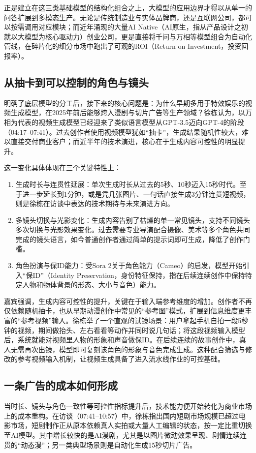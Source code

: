 \documentclass[UTF8,a4paper,11pt,fontset=fandol]{ctexart}
\begin{document}
正是建立在这三类基础模型的结构化组合之上，大模型的应用边界才得以从单一的问答扩展到多模态生产。无论是传统制造业与实体品牌商，还是互联网公司，都可以按需调用对应模块；而近年涌现的大量AI Native（AI原生，指从产品设计之初就以大模型为核心驱动力）创业公司，更是直接将千问与万相等模型组合为自动化管线，在碎片化的细分市场中跑出了可观的ROI（Return on Investment，投资回报率）。

\subsection{从抽卡到可以控制的角色与镜头}
明确了底层模型的分工后，接下来的核心问题是：为什么早期多用于特效娱乐的视频生成模型，在2025年前后能够跨入漫剧与切片广告等生产领域？徐栋认为，以万相为代表的视频生成模型已经迎来了类似语言模型从GPT-3.5迈向GPT-4的阶段（04:17–07:41）。过去创作者使用视频模型犹如“抽卡”，生成结果随机性较大，难以直接交付商业客户；而近半年的技术演进，核心在于生成内容可控性的明显提升。

这一变化具体体现在三个关键特性上：
\begin{enumerate}
\item 生成时长与连贯性延展：单次生成时长从过去的5秒、10秒迈入15秒时代。至于进一步延长到1分钟，或是凭几张图片、一句话直接生成3分钟连贯短视频，则是徐栋在访谈中表达的技术期待与未来演进方向。
\item 多镜头切换与光影变化：生成内容告别了枯燥的单一常见镜头，支持不同镜头多次切换与光影效果变化。过去需要专业导演配合摄像、美术等多个角色共同完成的镜头语言，如今普通创作者通过简单的提示词即可生成，降低了创作门槛。
\item 角色扮演与保ID能力：受Sora 2关于角色能力（Cameo）的启发，模型开始引入“保ID”（Identity Preservation，身份特征保持，指在后续连续创作中保持特定人物和物体背景的形态、大小与音色）能力。
\end{enumerate}

嘉宾强调，生成内容可控性的提升，关键在于输入端参考维度的增加。创作者不再仅依赖随机抽卡，也从早期动漫创作中常见的“参考图”模式，扩展到信息维度更丰富的“参考视频”输入。徐栋举了一个直观的试镜场景：用户拿起手机自拍一段5秒钟的视频，期间做抬头、左右看看等动作并同时说几句话；将这段视频输入模型后，系统就能对视频里人物的形象和声音做保ID。在后续连续的故事创作中，真人无需再次出镜，模型即可复刻该角色的形象与音色完成生成。这种配合筛选与修改的参考视频输入机制，让视频生成具备了进入流水线作业的可控基础。

\subsection{一条广告的成本如何形成}
当时长、镜头与角色一致性等可控性指标提升后，技术能力便开始转化为商业市场上的成本重构。在访谈（07:41–10:57）中，徐栋指出国内短剧市场规模已超过电影市场，短剧制作正从原本依赖真人实拍或大量人工编辑的状态，按一定比重切换至AI模型。其中增长较快的是AI漫剧，尤其是以图片微动效果呈现、剧情连续连贯的“动态漫”；另一类典型场景则是自动化生成15秒切片广告。
\end{document}
